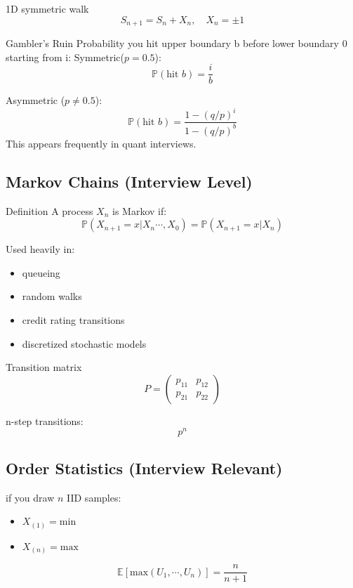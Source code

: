 \documentclass{report}
\begin{document}
1D symmetric walk
\begin{equation}
    S_{n+1}=S_n+X_n, \quad X_n = \pm 1
\end{equation}

Gambler's Ruin
Probability you hit upper boundary b before lower boundary 0 starting from i: 
Symmetric($p = 0.5$):
\begin{equation}
    \mathbb{P}(\text{hit } b) = \frac{i}{b}
\end{equation}

Asymmetric ($p \neq 0.5$):
\begin{equation}
    \mathbb{P}(\text{hit } b) = \frac{1 - (q/p)^i}{1 - (q/p)^b}
\end{equation}
This appears frequently in quant interviews.


\subsection*{Markov Chains (Interview Level)}

Definition
A process $X_n$ is Markov if:
\begin{equation}
    \mathbb{P}(X_{n+1}=x|X_n\cdots,X_0)=\mathbb{P}(X_{n+1}=x|X_n)
\end{equation}

Used heavily in:
\begin{itemize}
    \item queueing
    \item random walks
    \item credit rating transitions
    \item discretized stochastic models
\end{itemize}

Transition matrix
\begin{equation}
    P = 
    \begin{pmatrix}
    p_{11} & p_{12} \\
    p_{21} & p_{22}
    \end{pmatrix}
\end{equation}

n-step transitions:
\begin{equation*}
    p^{n}
\end{equation*}

\subsection*{Order Statistics (Interview Relevant)}
if you draw $n$ IID samples:
\begin{itemize}
    \item $X_{(1)}=\text{min}$
    \item $X_{(n)}=\text{max}$
\end{itemize}
\ex{}
{
    \begin{equation}
        \mathbb{E}[\text{max}(U_1,\cdots,U_n)]=\frac{n}{n+1}
    \end{equation}
}
\end{document}
